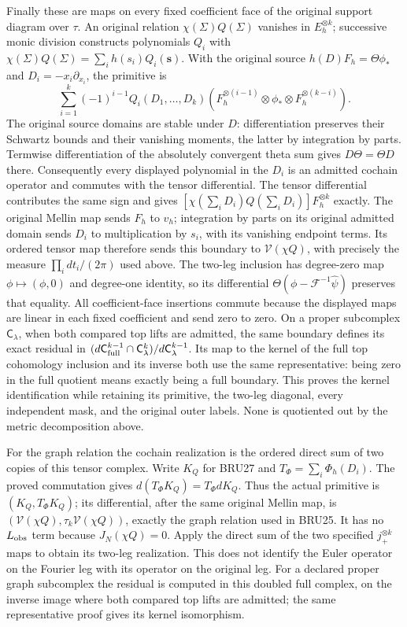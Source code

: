 Finally these are maps on every fixed coefficient face of the
original support diagram over $\tau$. An original relation
$\chi(\Sigma)Q(\Sigma)$ vanishes in $E_h^{\otimes k}$; successive
monic division constructs polynomials $Q_i$ with
$\chi(\Sigma)Q(\Sigma)=\sum_i h(s_i)Q_i(\mathbf s)$.
With the original source $h(D)F_h=\Theta\phi_*$ and
$D_i=-x_i\partial_{x_i}$, the primitive is
\[
 \sum_{i=1}^k(-1)^{i-1}Q_i(D_1,\ldots,D_k)
 (F_h^{\otimes(i-1)}\otimes\phi_*\otimes F_h^{\otimes(k-i)}).
 \tag{BRU27}
\]
The original source domains are stable under $D$: differentiation
preserves their Schwartz bounds and their vanishing moments, the
latter by integration by parts. Termwise differentiation of the
absolutely convergent theta sum gives $D\Theta=\Theta D$ there.
Consequently every displayed polynomial in the $D_i$ is an admitted
cochain operator and commutes with the tensor differential.
The tensor differential contributes the same sign and gives
$[\chi(\sum_i D_i)Q(\sum_iD_i)]F_h^{\otimes k}$ exactly.
The original Mellin map sends $F_h$ to $v_h$; integration by parts
on its original admitted domain sends $D_i$ to multiplication by
$s_i$, with its vanishing endpoint terms. Its ordered tensor map
therefore sends this boundary to $\mathcal V(\chi Q)$, with precisely
the measure $\prod_i dt_i/(2\pi)$ used above.
The two-leg inclusion has degree-zero
map $\phi\mapsto(\phi,0)$ and degree-one identity, so its differential
$\Theta(\phi-\mathcal F^{-1}\widehat\psi)$ preserves that equality.
All coefficient-face insertions commute because the displayed maps
are linear in each fixed coefficient and send zero to zero. On a
proper subcomplex $\mathsf C_\lambda$, when both compared top lifts
are admitted, the same boundary defines its exact residual in
$(d\mathsf C_{\rm full}^{k-1}\cap\mathsf C_\lambda^k)/
d\mathsf C_\lambda^{k-1}$. Its map to the kernel of the full top
cohomology inclusion and its inverse both use the same representative:
being zero in the full quotient means exactly being a full boundary.
This proves the kernel identification while retaining its primitive,
the two-leg diagonal, every independent mask, and the original outer
labels. None is quotiented out by the metric decomposition above.

For the graph relation the cochain realization is the ordered direct
sum of two copies of this tensor complex. Write $K_Q$ for BRU27 and
$T_\Phi=\sum_i\Phi_h(D_i)$. The proved commutation gives
$d(T_\Phi K_Q)=T_\Phi dK_Q$. Thus the actual primitive is
$(K_Q,T_\Phi K_Q)$; its differential, after the same original Mellin
map, is
$(\mathcal V(\chi Q),\tau_k\mathcal V(\chi Q))$, exactly the graph
relation used in BRU25. It has no $L_{\rm obs}$ term because
$J_N(\chi Q)=0$. Apply the direct sum of the two specified
$j_+^{\otimes k}$ maps to obtain its two-leg realization. This does
not identify the Euler operator on the Fourier leg with its operator
on the original leg. For a declared proper graph subcomplex the
residual is computed in this doubled full complex, on the inverse
image where both compared top lifts are admitted; the same
representative proof gives its kernel isomorphism.
